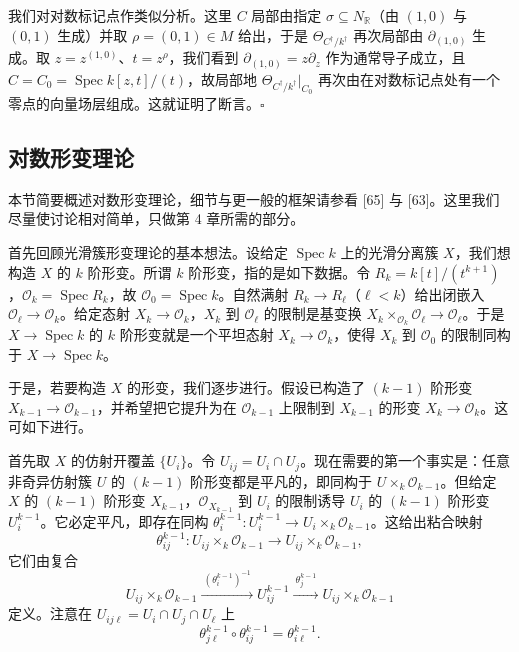 \begin{examples}
\begin{enumerate}[label=(\arabic*),leftmargin=2.2em,itemsep=3pt]
我们对对数标记点作类似分析。这里 $C$ 局部由指定 $\sigma\subseteq N_{\mathbb{R}}$（由 $(1,0)$ 与 $(0,1)$ 生成）并取 $\rho=(0,1)\in M$ 给出，于是 $\Theta_{C^{\dagger}/k^{\dagger}}$ 再次局部由 $\partial_{(1,0)}$ 生成。取 $z=z^{(1,0)}$、$t=z^{\rho}$，我们看到 $\partial_{(1,0)}=z\partial_z$ 作为通常导子成立，且 $C=C_0=\operatorname{Spec} k[z,t]/(t)$，故局部地 $\Theta_{C^{\dagger}/k^{\dagger}}|_{C_0}$ 再次由在对数标记点处有一个零点的向量场层组成。这就证明了断言。\hfill$\square$
\end{enumerate}
\end{examples}


\subsection{对数形变理论}

本节简要概述对数形变理论，细节与更一般的框架请参看 [65] 与 [63]。这里我们尽量使讨论相对简单，只做第 4 章所需的部分。

首先回顾光滑簇形变理论的基本想法。设给定 $\operatorname{Spec} k$ 上的光滑分离簇 $X$，我们想构造 $X$ 的 $k$ 阶形变。所谓 $k$ 阶形变，指的是如下数据。令 $R_k=k[t]/(t^{k+1})$，$\mathcal{O}_k=\operatorname{Spec} R_k$，故 $\mathcal{O}_0=\operatorname{Spec} k$。自然满射 $R_k\to R_{\ell}$（$\ell<k$）给出闭嵌入 $\mathcal{O}_{\ell}\to\mathcal{O}_k$。给定态射 $X_k\to\mathcal{O}_k$，$X_k$ 到 $\mathcal{O}_{\ell}$ 的限制是基变换 $X_k\times_{\mathcal{O}_k}\mathcal{O}_{\ell}\to\mathcal{O}_{\ell}$。于是 $X\to\operatorname{Spec} k$ 的 $k$ 阶形变就是一个平坦态射 $X_k\to\mathcal{O}_k$，使得 $X_k$ 到 $\mathcal{O}_0$ 的限制同构于 $X\to\operatorname{Spec} k$。

于是，若要构造 $X$ 的形变，我们逐步进行。假设已构造了 $(k-1)$ 阶形变 $X_{k-1}\to\mathcal{O}_{k-1}$，并希望把它提升为在 $\mathcal{O}_{k-1}$ 上限制到 $X_{k-1}$ 的形变 $X_k\to\mathcal{O}_k$。这可如下进行。

首先取 $X$ 的仿射开覆盖 $\{U_i\}$。令 $U_{ij}=U_i\cap U_j$。现在需要的第一个事实是：任意非奇异仿射簇 $U$ 的 $(k-1)$ 阶形变都是平凡的，即同构于 $U\times_k\mathcal{O}_{k-1}$。但给定 $X$ 的 $(k-1)$ 阶形变 $X_{k-1}$，$\mathcal{O}_{X_{k-1}}$ 到 $U_i$ 的限制诱导 $U_i$ 的 $(k-1)$ 阶形变 $U_i^{k-1}$。它必定平凡，即存在同构 $\theta_i^{k-1}:U_i^{k-1}\to U_i\times_k\mathcal{O}_{k-1}$。这给出粘合映射
\[
  \theta_{ij}^{k-1}:U_{ij}\times_k\mathcal{O}_{k-1}
  \longrightarrow U_{ij}\times_k\mathcal{O}_{k-1},
\]
它们由复合
\[
  U_{ij}\times_k\mathcal{O}_{k-1}
  \xrightarrow{\ (\theta_i^{k-1})^{-1}\ }
  U_{ij}^{k-1}
  \xrightarrow{\ \theta_j^{k-1}\ }
  U_{ij}\times_k\mathcal{O}_{k-1}
\]
定义。注意在 $U_{ij\ell}=U_i\cap U_j\cap U_{\ell}$ 上
\[
  \theta_{j\ell}^{k-1}\circ\theta_{ij}^{k-1}=\theta_{i\ell}^{k-1}.
\]

